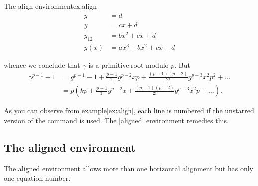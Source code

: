 {{{\begin{texexample}{The align environment}{ex:align}
\begin{align}
         y & = d\label{eq:IntoSection}\\
         y & = cx+d\\
    y_{12} & = bx^{2}+cx+d\\
     y(x)  & = ax^{3}+bx^{2}+cx+d
 \end{align}


whence we conclude that $\gamma$ is a primitive root modulo $p$. But
\begin{align*}
\gamma^{p-1}-1 &=
     g^{p-1} - 1 + \frac{p-1}{1!}g^{p-2}xp +
        \frac{(p-1)(p-2)}{2!}g^{p-3}x^2p^2 + \ldots \\
  &= p\left(kp + \frac{p-1}{1!}g^{p-2}x +
        \frac{(p-1)(p-2)}{2!}g^{p-3}x^2p + \ldots\right).
\end{align*}
\end{texexample}

As you can observe from example\ref{ex:align}, each line is numbered if the unstarred version of the command is used. The |aligned| environment remedies this.
 


\subsection{The aligned environment}

The aligned environment allows more than one horizontal alignment but has only one equation number.

}}}
